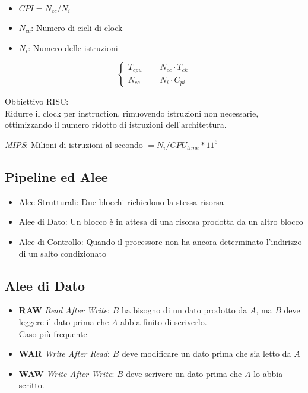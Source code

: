 \documentclass[a4paper,10pt]{article}
\begin{document}
\begin{itemize}
    \item $CPI = N_{cc}/N_i$
    \item $N_{cc}$: Numero di cicli di clock
    \item $N_i$: Numero delle istruzioni
\end{itemize}

\[
\begin{cases}
    T_{cpu} &= N_{cc} \cdot T_{ck}
    \\
    N_{cc} &= N_i \cdot C_{pi}
\end{cases}
\]


Obbiettivo RISC:
\\
Ridurre il clock per instruction, rimuovendo istruzioni non necessarie, ottimizzando il numero ridotto di istruzioni dell'architettura.

\textit{MIPS}: Milioni di istruzioni al secondo $ = N_i / CPU_{time} * 11^6$

\subsection{Pipeline ed Alee}
\begin{itemize}
    \item Alee Strutturali: Due blocchi richiedono la stessa risorsa
    \item Alee di Dato: Un blocco è in attesa di una risorsa prodotta da un altro blocco
    \item Alee di Controllo: Quando il processore non ha ancora determinato l'indirizzo di un salto condizionato
\end{itemize}

\subsection{Alee di Dato}
\begin{itemize}
    \item \textbf{RAW} \textit{Read After Write}:
        $B$ ha bisogno di un dato prodotto da $A$, ma $B$ deve leggere il dato prima che $A$ abbia finito di scriverlo.
        \\
        Caso più frequente
    \item \textbf{WAR} \textit{Write After Read}:
        $B$ deve modificare un dato prima che sia letto da $A$
    \item \textbf{WAW} \textit{Write After Write}:
        $B$ deve scrivere un dato prima che $A$ lo abbia scritto.
\end{itemize}
\end{document}
